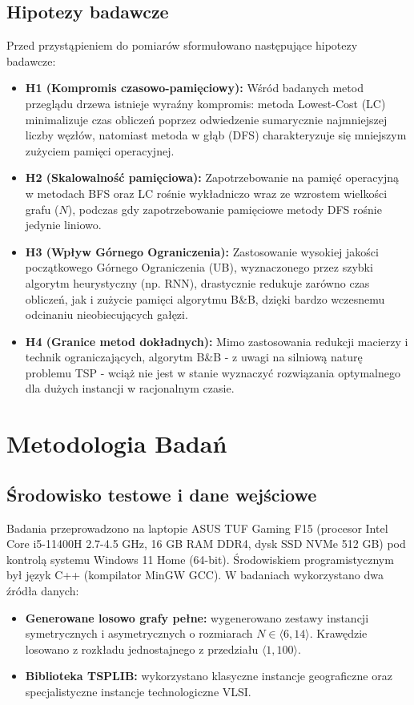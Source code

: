 \documentclass[conference]{IEEEtran}
\begin{document}
        \subsection{Hipotezy badawcze}
            Przed przystąpieniem do pomiarów sformułowano następujące hipotezy badawcze:
            \begin{itemize}
                \item \textbf{H1 (Kompromis czasowo-pamięciowy):} Wśród badanych metod przeglądu drzewa istnieje wyraźny kompromis: metoda Lowest-Cost (LC) minimalizuje czas obliczeń poprzez odwiedzenie sumarycznie najmniejszej liczby węzłów, natomiast metoda w głąb (DFS) charakteryzuje się mniejszym zużyciem pamięci operacyjnej.
                \item \textbf{H2 (Skalowalność pamięciowa):} Zapotrzebowanie na pamięć operacyjną w metodach BFS oraz LC rośnie wykładniczo wraz ze wzrostem wielkości grafu ($N$), podczas gdy zapotrzebowanie pamięciowe metody DFS rośnie jedynie liniowo.
                \item \textbf{H3 (Wpływ Górnego Ograniczenia):} Zastosowanie wysokiej jakości początkowego Górnego Ograniczenia (UB), wyznaczonego przez szybki algorytm heurystyczny (np. RNN), drastycznie redukuje zarówno czas obliczeń, jak i zużycie pamięci algorytmu B\&B, dzięki bardzo wczesnemu odcinaniu nieobiecujących gałęzi.
                \item \textbf{H4 (Granice metod dokładnych):} Mimo zastosowania redukcji macierzy i technik ograniczających, algorytm B\&B - z uwagi na silniową naturę problemu TSP - wciąż nie jest w stanie wyznaczyć rozwiązania optymalnego dla dużych instancji w racjonalnym czasie.
            \end{itemize}


    \section{Metodologia Badań}
        \subsection{Środowisko testowe i dane wejściowe}
            Badania przeprowadzono na laptopie ASUS TUF Gaming F15 (procesor Intel Core i5-11400H 2.7-4.5 GHz, 16 GB RAM DDR4, dysk SSD NVMe 512 GB) pod kontrolą systemu Windows 11 Home (64-bit). Środowiskiem programistycznym był język C++ (kompilator MinGW GCC). 
            W badaniach wykorzystano dwa źródła danych:
            \begin{itemize}
                \item \textbf{Generowane losowo grafy pełne:} wygenerowano zestawy instancji symetrycznych i asymetrycznych o rozmiarach $N \in \langle 6, 14 \rangle$. Krawędzie losowano z rozkładu jednostajnego z przedziału $\langle 1, 100 \rangle$.
                \item \textbf{Biblioteka TSPLIB:} wykorzystano klasyczne instancje geograficzne oraz specjalistyczne instancje technologiczne VLSI.
            \end{itemize}
\end{document}
